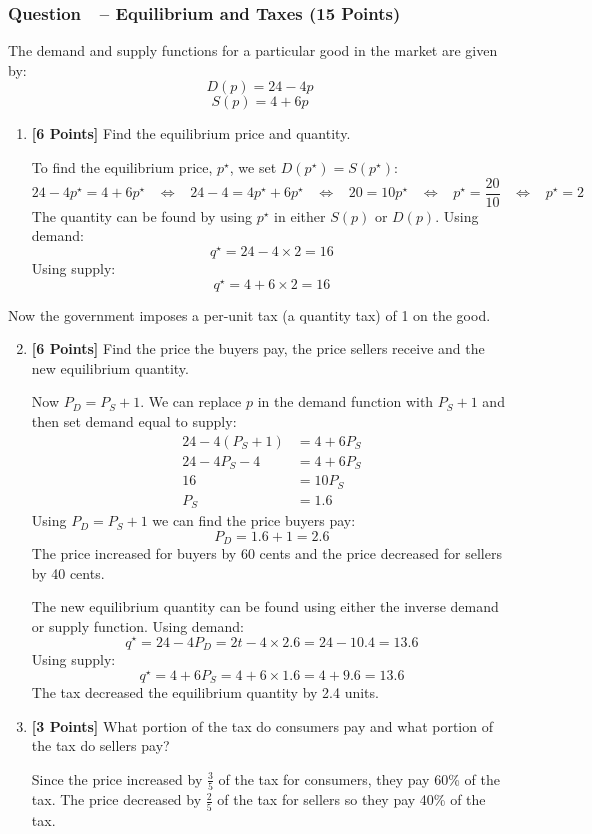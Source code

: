 \documentclass[10pt]{article}
\newcounter{question}[section]
\newcommand{\question}[1]{\refstepcounter{question}
  \subsubsection*{Question~\thequestion~-- #1}}
\newenvironment{subquestions}{
  \begin{enumerate}[label=(\roman*)]}{\end{enumerate}}
\begin{document}
\question{Equilibrium and Taxes (15 Points)}
The demand and supply functions for a particular good
  in the market are given by:
\[
  D\left( p \right) = 24 - 4p
\]
\[
  S\left( p \right) = 4 + 6p
\]
\begin{subquestions}
  \item \textbf{[6 Points]} Find the equilibrium price and quantity.

    \textcolor{solution-color}{
      To find the equilibrium price, $p^\star$, we set $D\left( p^\star
      \right)=S\left( p^\star \right)$:
    \[
      24-4p^\star=4+6p^\star \;\;\; \Longleftrightarrow \;\;\;
      24-4=4p^\star+6p^\star \;\;\; \Longleftrightarrow \;\;\;
      20=10p^\star \;\;\; \Longleftrightarrow \;\;\;
      p^\star=\frac{20}{10} \;\;\; \Longleftrightarrow \;\;\;
      p^\star=2
    \]
    The quantity can be found by using $p^\star$ in either $S\left( p
    \right)$ or $D\left( p \right)$. Using demand:
    \[
      q^\star = 24 - 4\times 2=16
    \]
    Using supply:
    \[
      q^\star = 4 + 6\times 2=16
    \]
    }


\end{subquestions}
Now the government imposes a per-unit tax (a quantity tax) of 1 on the good.
\begin{subquestions}
  \setcounter{enumi}{1}
  \item \textbf{[6 Points]}  Find the price the buyers pay, the price sellers
    receive and the new equilibrium quantity.

    \textcolor{solution-color}{
      Now $P_D=P_S+1$. We can replace $p$ in the demand function with $P_S+1$
      and then set demand equal to supply:
      \begin{align*}
        24 - 4\left( P_S+1 \right) &= 4+ 6P_S \\
        24 - 4P_S -4 &= 4 + 6P_S \\
        16  &=  10P_S \\
        P_S &= 1.6
      \end{align*}
      Using $P_D=P_S+1$ we can find the price buyers pay:
      \[
        P_D=1.6+1 = 2.6
      \]
      The price increased for buyers by 60 cents and the price
      decreased for sellers by 40 cents.
    }

    \textcolor{solution-color}{
      The new equilibrium quantity can be found using either the inverse demand
      or supply function. Using demand:
      \[
        q^\star = 24 - 4P_D = 2t - 4 \times 2.6 = 24 - 10.4 = 13.6
      \]
      Using supply:
      \[
        q^\star = 4 + 6P_S = 4 + 6 \times 1.6 = 4 + 9.6 = 13.6
      \]
      The tax decreased the equilibrium quantity by 2.4 units.
    }

  \item \textbf{[3 Points]}  What portion of the tax do consumers pay and what
    portion of the tax do sellers pay?

    \textcolor{solution-color}{
      Since the price increased by $\frac{3}{5}$ of the tax for consumers, they
      pay 60\% of the tax. The price decreased by $\frac{2}{5}$ of the tax for
      sellers so they pay 40\% of the tax.
    }
\end{subquestions}
\end{document}
